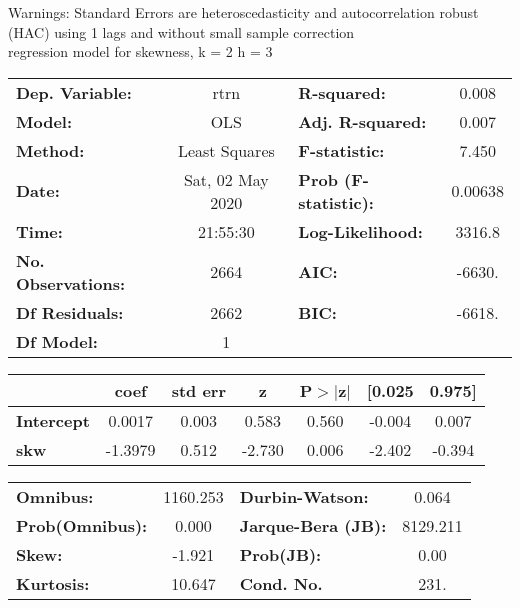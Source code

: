 Warnings: \newline
 [1] Standard Errors are heteroscedasticity and autocorrelation robust (HAC) using 1 lags and without small sample correction\\ 

regression model for skewness, k = 2 h = 3\begin{center}
\begin{tabular}{lclc}
\toprule
\textbf{Dep. Variable:}    &       rtrn       & \textbf{  R-squared:         } &     0.008   \\
\textbf{Model:}            &       OLS        & \textbf{  Adj. R-squared:    } &     0.007   \\
\textbf{Method:}           &  Least Squares   & \textbf{  F-statistic:       } &     7.450   \\
\textbf{Date:}             & Sat, 02 May 2020 & \textbf{  Prob (F-statistic):} &  0.00638    \\
\textbf{Time:}             &     21:55:30     & \textbf{  Log-Likelihood:    } &    3316.8   \\
\textbf{No. Observations:} &        2664      & \textbf{  AIC:               } &    -6630.   \\
\textbf{Df Residuals:}     &        2662      & \textbf{  BIC:               } &    -6618.   \\
\textbf{Df Model:}         &           1      & \textbf{                     } &             \\
\bottomrule
\end{tabular}
\begin{tabular}{lcccccc}
                   & \textbf{coef} & \textbf{std err} & \textbf{z} & \textbf{P$> |$z$|$} & \textbf{[0.025} & \textbf{0.975]}  \\
\midrule
\textbf{Intercept} &       0.0017  &        0.003     &     0.583  &         0.560        &       -0.004    &        0.007     \\
\textbf{skw}       &      -1.3979  &        0.512     &    -2.730  &         0.006        &       -2.402    &       -0.394     \\
\bottomrule
\end{tabular}
\begin{tabular}{lclc}
\textbf{Omnibus:}       & 1160.253 & \textbf{  Durbin-Watson:     } &    0.064  \\
\textbf{Prob(Omnibus):} &   0.000  & \textbf{  Jarque-Bera (JB):  } & 8129.211  \\
\textbf{Skew:}          &  -1.921  & \textbf{  Prob(JB):          } &     0.00  \\
\textbf{Kurtosis:}      &  10.647  & \textbf{  Cond. No.          } &     231.  \\
\bottomrule
\end{tabular}
\end{center}

